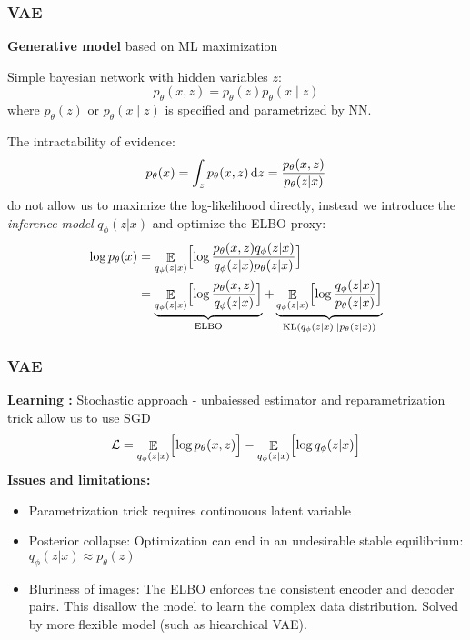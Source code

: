 \documentclass[11pt]{beamer}
\DeclareMathOperator{\EX}{\mathbb{E}}
\renewcommand{\d}[1]{\mbox{\rm d}#1}
\begin{document}
\begin{frame}
    \frametitle{VAE}
    \textbf{Generative model} based on ML maximization

    Simple bayesian network with hidden variables $z$:
    $$
    p_{\theta}(x,z) = p_{\theta}(z)p_{\theta}(x\mid z)
    $$
    where $p_{\theta}(z)$ or $p_{\theta}(x\mid z)$ is specified and parametrized by NN.

    The intractability of evidence:
    $$
    p_{\theta}(x) = \int_{z} p_{\theta}(x,z)\, \d z = \frac{p_{\theta}(x,z)}{p_{\theta}(z|x)}
    $$ 
    do not allow us to maximize the log-likelihood directly, instead we introduce the \textit{inference model} $q_{\phi}(z|x)$
    and optimize the ELBO proxy:
    \begin{align*}
        \log p_\theta(x) &= \EX_{q_{\phi}(z|x)} \Bigl[ \log \frac{p_\theta(x,z)q_\phi(z|x)}{q_\phi(z|x)p_\theta(z|x)} \Bigr] \\  
        &=\underbrace{\EX_{q_{\phi}(z|x)} \Bigl[ \log \frac{p_\theta(x,z)}{q_\phi(z|x)} \Bigr]}_{\mathrm{ELBO}} + 
        \underbrace{\EX_{q_{\phi}(z|x)} \Bigl[ \log \frac{q_\phi(z|x)}{p_{\theta}(z|x)} \Bigr]}_{\mathrm{KL}(q_{\phi}(z|x) || p_{\theta}(z|x))}
    \end{align*}
\end{frame}

\begin{frame}
    \frametitle{VAE}
    \textbf{Learning :} Stochastic approach - unbaiessed estimator and reparametrization trick allow us to use SGD
    \begin{align*}
    \mathcal{L} = \EX_{q_{\phi}(z|x)} \Bigl[ \log {p_\theta(x,z)} \Bigr] - \EX_{q_{\phi}(z|x)} \Bigl[ \log {q_\phi(z|x)} \Bigr] 
    \end{align*}
    \textbf{Issues and limitations:} 
    \begin{itemize}
        \item Parametrization trick requires continouous latent variable
        \item Posterior collapse: Optimization can end in an undesirable stable equilibrium: $q_{\phi}(z|x) \approx p_{\theta}(z)$
        \item Bluriness of images: The ELBO enforces the consistent encoder and decoder pairs. This disallow the model to learn 
        the complex data distribution. Solved by more flexible model (such as hiearchical VAE).
    \end{itemize}

\end{frame}
\end{document}
